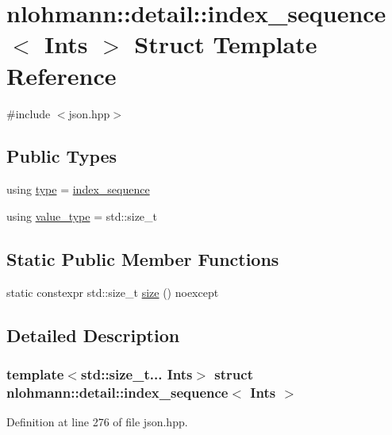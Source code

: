 \hypertarget{structnlohmann_1_1detail_1_1index__sequence}{}\section{nlohmann\+:\+:detail\+:\+:index\+\_\+sequence$<$ Ints $>$ Struct Template Reference}
\label{structnlohmann_1_1detail_1_1index__sequence}


{\ttfamily \#include $<$json.\+hpp$>$}

\subsection*{Public Types}
\begin{DoxyCompactItemize}
\item 
using \hyperlink{structnlohmann_1_1detail_1_1index__sequence_a3c14c4ab277de72b166806193ff4fa10}{type} = \hyperlink{structnlohmann_1_1detail_1_1index__sequence}{index\+\_\+sequence}
\item 
using \hyperlink{structnlohmann_1_1detail_1_1index__sequence_a2eca43d08fc1eb68bd5fa75b6714d21d}{value\+\_\+type} = std\+::size\+\_\+t
\end{DoxyCompactItemize}
\subsection*{Static Public Member Functions}
\begin{DoxyCompactItemize}
\item 
static constexpr std\+::size\+\_\+t \hyperlink{structnlohmann_1_1detail_1_1index__sequence_a7ac529419787d775f52408135304b337}{size} () noexcept
\end{DoxyCompactItemize}


\subsection{Detailed Description}
\subsubsection*{template$<$std\+::size\+\_\+t... Ints$>$\newline
struct nlohmann\+::detail\+::index\+\_\+sequence$<$ Ints $>$}



Definition at line 276 of file json.\+hpp.



